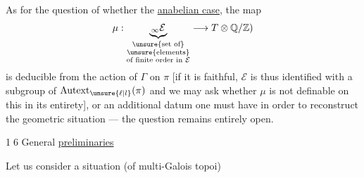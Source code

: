 As for the question of whether
 the \uline{anabelian case},
the map
\[
\mu:\underbrace{{}_\infty\mathcal E}_{
\substack{\text{\unsure{set of}}\\
\text{\unsure{elements}}\\
\text{of finite order in }\mathcal E}}
\longrightarrow T\otimes\mathbb Q/\mathbb Z)
\]
is deducible from the action of \(\Gamma\) on \(\pi\)
[if it is faithful, \(\mathcal E\) is thus identified with a subgroup
of \(\operatorname{Autext}_{\unsure{\ell|l}}(\pi)\)
and we may ask whether \(\mu\) is not
 definable on this in its entirety],
or  an additional datum one must have in order to
reconstruct the geometric situation --- the question remains entirely open.

\textcircled{16}\quad
{}
General  \uline{preliminaries}

Let us consider a situation
(of multi-Galois topoi)

